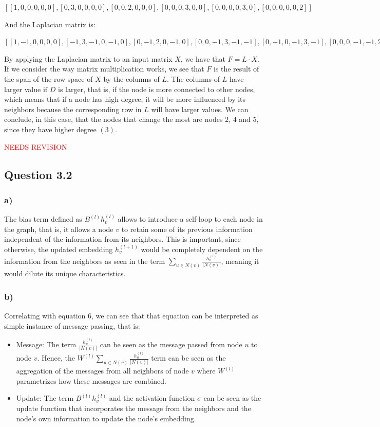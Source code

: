 \documentclass{article}
\begin{document}
$[
[1, 0, 0, 0, 0, 0],
[0, 3, 0, 0, 0, 0],
[0, 0, 2, 0, 0, 0],
[0, 0, 0, 3, 0, 0],
[0, 0, 0, 0, 3, 0],
[0, 0, 0, 0, 0, 2]]$

And the Laplacian matrix is:

$[
[1, -1,  0, 0, 0, 0],
[-1, 3, -1, 0, -1, 0],
[0, -1,  2, 0, -1, 0],
[0, 0,  -1, 3, -1, -1],
[0, -1,  0, -1, 3, -1],
[0, 0,   0, -1, -1, 2]]$

By applying the Laplacian matrix to an input matrix $X$, we have that $F = L \cdot X$. 
If we consider the way matrix multiplication works, we see that $F$ is the result of the span of the row space of $X$ by the columns of $L$.
The columns of $L$ have larger value if $D$ is larger, that is, if the node is more connected to other nodes, which means that
if a node has high degree, it will be more influenced by its neighbors because the corresponding row in $L$ will have larger values.
We can conclude, in this case, that the nodes that change the most are nodes $2$, $4$ and $5$, since they have higher degree $(3)$.

\textcolor{red}{NEEDS REVISION}

\subsection*{Question 3.2}

\subsubsection*{a)}

The bias term defined as $B^{(l)}h_v^{(l)}$ allows to introduce a self-loop to each node in the graph, that is, it allows
a node $v$ to retain some of its previous information independent of the information from its neighbors. This is important,
since otherwise, the updated embedding $h_v^{(l+1)}$ would be completely dependent on the information from the neighbors
as seen in the term $\sum_{u \in N(v)} \frac{h_u^{(l)}}{|N(v)|}$, meaning it would dilute its unique characteristics.

\subsubsection*{b)}

Correlating with equation 6, we can see that that equation can be interpreted as simple instance of message passing, that is:

\begin{itemize}
    \item Message: The term $\frac{h_u^{(l)}}{|N(v)|}$ can be seen as the message passed from node $u$ to node $v$. Hence,
the $W^{(l)} \sum_{u \in N(v)} \frac{h_u^{(l)}}{|N(v)|}$ term can be seen as the aggregation of the messages from all neighbors of node $v$
where $W^{(l)}$ parametrizes how these messages are combined.
    \item Update: The term $B^{(l)}h_v^{(l)}$ and the activation function $\sigma$ can be seen as the update function that
incorporates the message from the neighbors and the node's own information to update the node's embedding.
\end{itemize}
\end{document}
